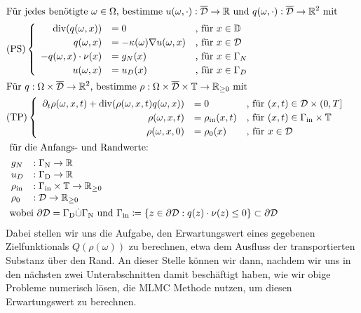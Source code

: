 \begin{align*}
\setlength\arraycolsep{1pt}
&\text{Für jedes benötigte } \omega \in \Omega \text{, bestimme } u(\omega,\cdot):\overline{\mathcal{D}} \to \R \text{ und } q(\omega, \cdot): \overline{\mathcal{D}} \to \R^2 \text{ mit } \\
&\text{(PS)}
	\begin{cases}
		\begin{array}{rlll}
		\dive (q(\omega,x)) &= 0  &\text{, für } x \in \mathbb{ D}\\  
		q(\omega,x) &= - \kappa(\omega) \nabla u(\omega,x)  &\text{, für } x \in \mathcal{D}\\
		-q(\omega,x) \cdot \nu(x) &= g_N(x)  &\text{, für } x \in \Gamma_N \\
		u(\omega,x) &= u_D(x)  &\text{, für } x \in \Gamma_D \\
		\end{array}
	\end{cases} \\
&\text{Für } q: \Omega \times \overline{\mathcal{D}} \to \R^2 \text{, bestimme }\rho: \Omega \times \overline{\mathcal{D}} \times \mathbb{T} \to \R_{\geq 0} \text{ mit} \\
&\text{(TP)} 
	\begin{cases}
		\begin{array}{rlll}
			\partial_t \rho (\omega, x, t) + \dive(\rho(\omega,x,t)q(\omega,x)) &= 0 &\text{, für } (x,t) \in \mathcal{D} \times (0,T] \\
			\rho(\omega,x,t) &= \rho_{\text{in}}(x,t) &\text{, für } (x,t) \in \Gamma_{\text{in}} \times \mathbb{T} \\
			\rho(\omega,x,0)  &= \rho_0(x) &\text{, für } x \in  \mathcal{D}
		\end{array}
	\end{cases} \\
&\text{ für die Anfangs- und Randwerte: } \\ 
	&\begin{array}{llr}
		g_N&: \Gamma_{\text{N}} \to \R \\
		u_D&: \Gamma_{\text{D}} \to \R \\
	    \rho_{\text{in}}&: \Gamma_{\text{in}} \times \mathbb{T} \to \R_{\geq0} \\
		\rho_0&: \mathcal{D} \to \R_{\geq0} \\
	\end{array} \newline \\
&\text{ wobei } \partial \mathcal{D} = \Gamma_{\text{D}} \dot{\cup} \Gamma_{\text{N}}  \text{ und }  \Gamma_{\text{in}} \coloneqq  \{ z \in \partial \mathcal{D}: q(z)\cdot \nu(z) \leq 0 \} \subset  \partial \mathcal{D}
\end{align*}
Dabei stellen wir uns die Aufgabe, den Erwartungswert eines gegebenen Zielfunktionals $Q(\rho(\omega))$ zu berechnen, etwa dem Ausfluss der transportierten Substanz über den Rand. An dieser Stelle können wir dann, nachdem wir uns in den nächsten zwei Unterabschnitten damit beschäftigt haben, wie wir obige Probleme numerisch lösen, die MLMC Methode nutzen, um diesen Erwartungswert zu berechnen. 
